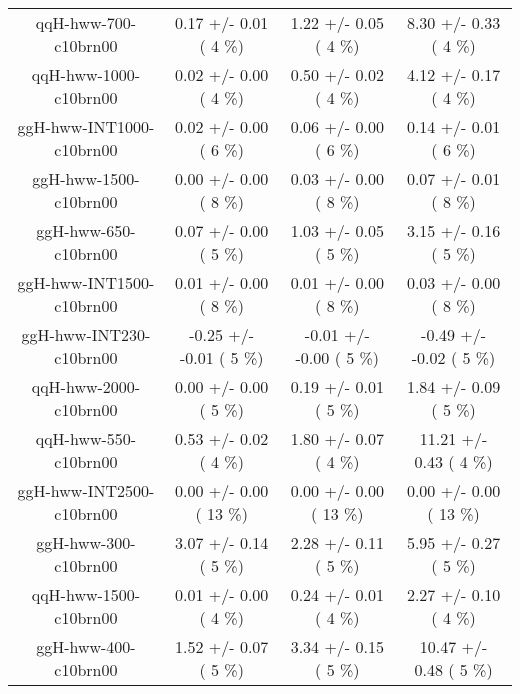 \begin{table}[h!]
\begin{center}
{\begin{tabular}{
c| c | c | c | }
 qqH-hww-700-c10brn00   &       0.17 +/-       0.01 (         4 \%)   &       1.22 +/-       0.05 (         4 \%)   &       8.30 +/-       0.33 (         4 \%)  \\
 qqH-hww-1000-c10brn00   &       0.02 +/-       0.00 (         4 \%)   &       0.50 +/-       0.02 (         4 \%)   &       4.12 +/-       0.17 (         4 \%)  \\
 ggH-hww-INT1000-c10brn00   &       0.02 +/-       0.00 (         6 \%)   &       0.06 +/-       0.00 (         6 \%)   &       0.14 +/-       0.01 (         6 \%)  \\
 ggH-hww-1500-c10brn00   &       0.00 +/-       0.00 (         8 \%)   &       0.03 +/-       0.00 (         8 \%)   &       0.07 +/-       0.01 (         8 \%)  \\
 ggH-hww-650-c10brn00   &       0.07 +/-       0.00 (         5 \%)   &       1.03 +/-       0.05 (         5 \%)   &       3.15 +/-       0.16 (         5 \%)  \\
 ggH-hww-INT1500-c10brn00   &       0.01 +/-       0.00 (         8 \%)   &       0.01 +/-       0.00 (         8 \%)   &       0.03 +/-       0.00 (         8 \%)  \\
 ggH-hww-INT230-c10brn00   &      -0.25 +/-      -0.01 (         5 \%)   &      -0.01 +/-      -0.00 (         5 \%)   &      -0.49 +/-      -0.02 (         5 \%)  \\
 qqH-hww-2000-c10brn00   &       0.00 +/-       0.00 (         5 \%)   &       0.19 +/-       0.01 (         5 \%)   &       1.84 +/-       0.09 (         5 \%)  \\
 qqH-hww-550-c10brn00   &       0.53 +/-       0.02 (         4 \%)   &       1.80 +/-       0.07 (         4 \%)   &      11.21 +/-       0.43 (         4 \%)  \\
 ggH-hww-INT2500-c10brn00   &       0.00 +/-       0.00 (        13 \%)   &       0.00 +/-       0.00 (        13 \%)   &       0.00 +/-       0.00 (        13 \%)  \\
 ggH-hww-300-c10brn00   &       3.07 +/-       0.14 (         5 \%)   &       2.28 +/-       0.11 (         5 \%)   &       5.95 +/-       0.27 (         5 \%)  \\
 qqH-hww-1500-c10brn00   &       0.01 +/-       0.00 (         4 \%)   &       0.24 +/-       0.01 (         4 \%)   &       2.27 +/-       0.10 (         4 \%)  \\
 ggH-hww-400-c10brn00   &       1.52 +/-       0.07 (         5 \%)   &       3.34 +/-       0.15 (         5 \%)   &      10.47 +/-       0.48 (         5 \%)  \\
\hline

\end{tabular}
}
\end{center}
\end{table}

